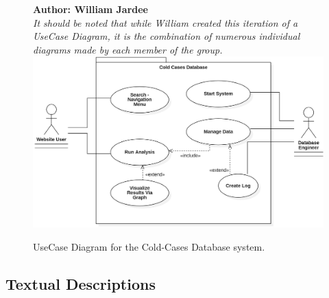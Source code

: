\documentclass[11pt]{article}
\begin{document}
\begin{figure}[!ht]
\centering
\textbf{Author: William Jardee}\\
\textit{It should be noted that while William created this iteration of a UseCase Diagram, it is the combination of numerous individual diagrams made by each member of the group.}
	\includegraphics[width=.95\textwidth]{./UseCases/jardee_usecase_2}\\
	\caption{UseCase Diagram for the Cold-Cases Database system.}
	\label{fig:usecase_diagram}
\end{figure}
\clearpage



\subsection{Textual Descriptions}
\end{document}
